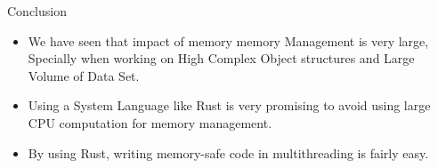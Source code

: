 \documentclass[9pt]{beamer}
\begin{document}
\begin{frame}[fragile]{Conclusion}
    \begin{itemize}
        \item We have seen that impact of memory memory Management is very large, 
              Specially when working on High Complex Object structures and Large Volume of Data Set. 

        \item Using a System Language like Rust is very promising to avoid using large CPU computation for memory management. 
        \item By using Rust, writing memory-safe code in multithreading is fairly easy.
         
    \end{itemize}
\end{frame}
\end{document}
